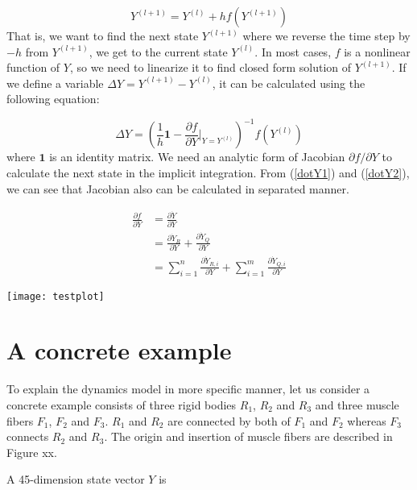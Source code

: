 \documentclass[a4paper,10pt]{article}
\begin{document}
\begin{equation}
Y^{(l+1)}=Y^{(l)}+hf(Y^{(l+1)})
\end{equation}
That is, we want to find the next state $Y^{(l+1)}$ where we
reverse the time step by $-h$ from $Y^{(l+1)}$, we get to the current state
$Y^{(l)}$. In most cases, $f$ is a nonlinear function of $Y$, so we need to
linearize it to find closed form solution of $Y^{(l+1)}$. If we define a
variable $\Delta Y = Y^{(l+1)}-Y^{(l)}$, it can be calculated using the
following equation:

\begin{equation}
\Delta Y = \left(  \frac{1}{h}\mathbf{1} - {\frac{\partial f}{\partial Y} \bigg|_{Y=Y^{(l)}}}\right)^{-1} f(Y^{(l)})
\end{equation}
where $\mathbf{1}$ is an identity matrix. We need an analytic form of
Jacobian $\partial f / \partial Y$ to calculate the next state in the
implicit integration. From (\ref{dotY1}) and (\ref{dotY2}), we can see that
Jacobian also can be calculated in separated manner.


\begin{align*}
\frac{\partial f}{\partial Y}
        & = \frac{\partial\dot{Y}}{\partial Y}\\
        & = \frac{\partial\dot{Y}_R}{\partial Y} + \frac{\partial\dot{Y}_Q}{\partial Y}\\
        & = \sum_{i=1}^{n}\frac{\partial\dot{Y}_{R,i}}{\partial Y} + \sum_{i=1}^{m}\frac{\partial\dot{Y}_{Q,i}}{\partial Y}
\end{align*}

\texttt{[image: testplot]}

\section{A concrete example}

To explain the dynamics model in more specific manner, let us consider
a concrete example consists of three rigid bodies $R_1$, $R_2$ and $R_3$
and three muscle fibers $F_1$, $F_2$ and $F_3$. $R_1$ and $R_2$ are connected
by both of $F_1$ and $F_2$ whereas $F_3$ connects $R_2$ and $R_3$. The
origin and insertion of muscle fibers are described in Figure xx.

A 45-dimension state vector $Y$ is
\end{document}
